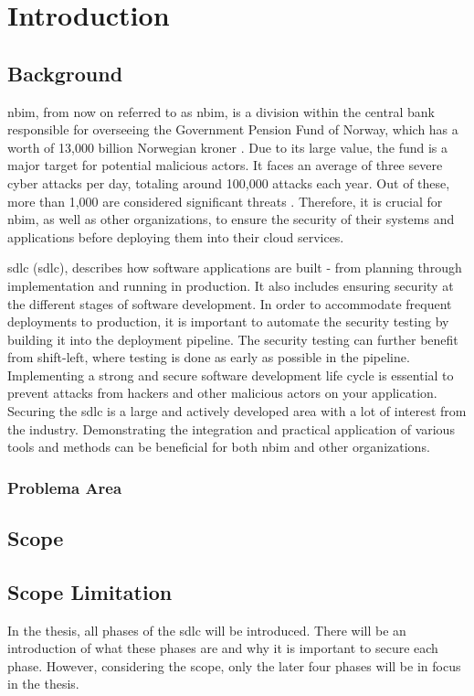 \chapter{Introduction}

\section{Background} %
\acrlong{nbim}, from now on referred to as \acrshort{nbim}, is a division within the central bank responsible for overseeing the Government Pension Fund of Norway, which has a worth of 13,000 billion Norwegian kroner \cite{nbimwebsite}. Due to its large value, the fund is a major target for potential malicious actors. It faces an average of three severe cyber attacks per day, totaling around 100,000 attacks each year. Out of these, more than 1,000 are considered significant threats \cite{nbimattacks}. Therefore, it is crucial for \acrshort{nbim}, as well as other organizations, to ensure the security of their systems and applications before deploying them into their cloud services. 

\acrlong{sdlc} (\acrshort{sdlc}), describes how software applications are built - from planning through implementation and running in production. It also includes ensuring security at the different stages of software development. In order to accommodate frequent deployments to production, it is important to automate the security testing by building it into the deployment pipeline. The security testing can further benefit from shift-left, where testing is done as early as possible in the pipeline. Implementing a strong and secure software development life cycle is essential to prevent attacks from hackers and other malicious actors on your application. Securing the \acrshort{sdlc} is a large and actively developed area with a lot of interest from the industry. Demonstrating the integration and practical application of various tools and methods can be beneficial for both \acrshort{nbim} and other organizations.

\subsection{Problema Area}

\section{Scope}
\section{Scope Limitation}
In the thesis, all phases of the \acrlong{sdlc} will be introduced. There will be an introduction of what these phases are and why it is important to secure each phase. However, considering the scope, only the later four phases will be in focus in the thesis. 


